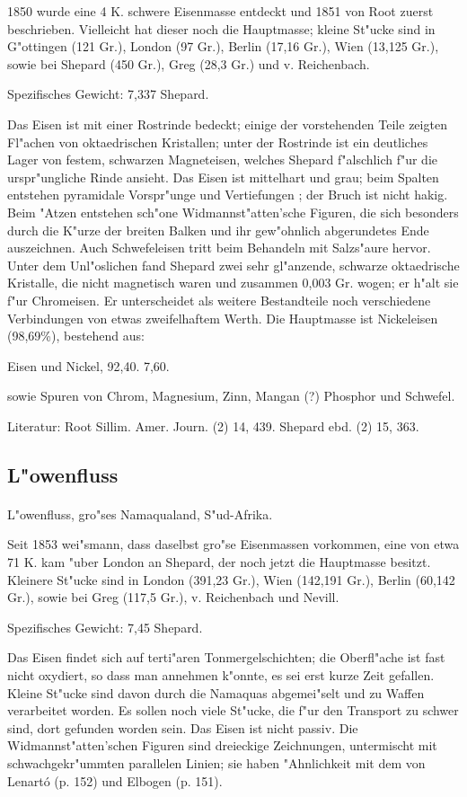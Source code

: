 \documentclass[a4paper, 11pt, oneside]{article}
\begin{document}
1850 wurde eine 4 K. schwere Eisenmasse entdeckt und 1851 von Root zuerst beschrieben. Vielleicht hat dieser noch die Hauptmasse; kleine St"ucke sind in G"ottingen (121 Gr.), London (97 Gr.), Berlin (17,16 Gr.), Wien (13,125 Gr.), sowie bei Shepard (450 Gr.), Greg (28,3 Gr.) und v. Reichenbach.

Spezifisches Gewicht: 7,337 Shepard.

Das Eisen ist mit einer Rostrinde bedeckt; einige der vorstehenden Teile zeigten Fl"achen von oktaedrischen Kristallen; unter der Rostrinde ist ein deutliches Lager von festem, schwarzen Magneteisen, welches Shepard f"alschlich f"ur die urspr"ungliche Rinde ansieht. Das Eisen ist mittelhart und grau; beim Spalten entstehen pyramidale Vorspr"unge und Vertiefungen ; der Bruch ist nicht hakig. Beim "Atzen entstehen sch"one Widmannst"atten'sche Figuren, die sich besonders durch die K"urze der breiten Balken und ihr gew"ohnlich abgerundetes Ende auszeichnen. Auch Schwefeleisen tritt beim Behandeln mit Salzs"aure hervor. Unter dem Unl"oslichen fand Shepard zwei sehr gl"anzende, schwarze oktaedrische Kristalle, die nicht magnetisch waren und zusammen 0,003 Gr. wogen; er h"alt sie f"ur Chromeisen. Er unterscheidet als weitere Bestandteile noch verschiedene Verbindungen von etwas zweifelhaftem Werth. Die Hauptmasse ist Nickeleisen (98,69\%), bestehend aus:

Eisen und Nickel,  
92,40. 7,60.

sowie Spuren von Chrom, Magnesium, Zinn, Mangan (?) Phosphor und Schwefel.

Literatur: Root Sillim. Amer. Journ. (2) 14, 439. Shepard ebd. (2) 15, 363.

\subsection{L"owenfluss}
\normalsize
\paragraph{}
L"owenfluss, gro"ses Namaqualand, S"ud-Afrika.

Seit 1853 wei"smann, dass daselbst gro"se Eisenmassen vorkommen, eine von etwa 71 K. kam "uber London an Shepard, der noch jetzt die Hauptmasse besitzt. Kleinere St"ucke sind in London (391,23 Gr.), Wien (142,191 Gr.), Berlin (60,142 Gr.), sowie bei Greg (117,5 Gr.), v. Reichenbach und Nevill.

Spezifisches Gewicht: 7,45 Shepard.

Das Eisen findet sich auf terti"aren Tonmergelschichten; die Oberfl"ache ist fast nicht oxydiert, so dass man annehmen k"onnte, es sei erst kurze Zeit gefallen. Kleine St"ucke sind davon durch die Namaquas abgemei"selt und zu Waffen verarbeitet worden. Es sollen noch viele St"ucke, die f"ur den Transport zu schwer sind, dort gefunden worden sein. Das Eisen ist nicht passiv. Die Widmannst"atten'schen Figuren sind dreieckige Zeichnungen, untermischt mit schwachgekr"ummten parallelen Linien; sie haben "Ahnlichkeit mit dem von Lenartó (p. 152) und Elbogen (p. 151).
\end{document}
